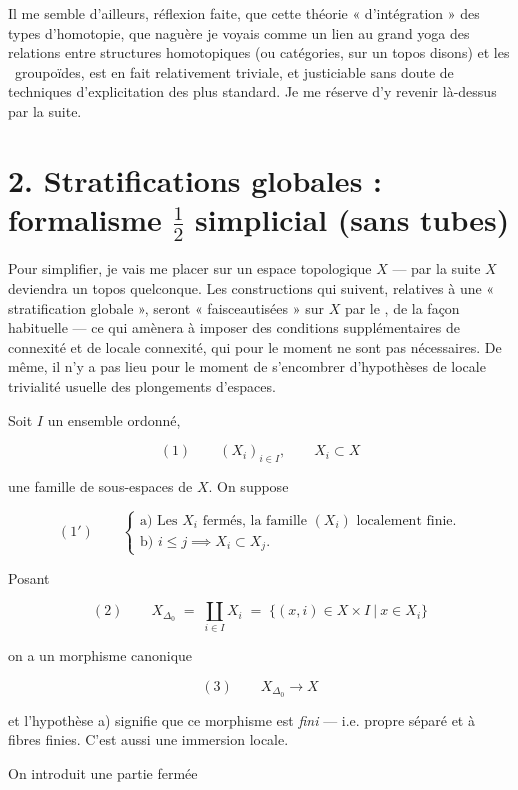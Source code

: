 \documentclass[11pt,a4paper]{article}
\begin{document}
Il me semble d'ailleurs, réflexion faite, que cette théorie « d'intégration »
des types d'homotopie, que naguère je voyais comme un lien au grand yoga des
relations entre structures homotopiques (ou catégories, sur un topos disons)
et les \ill\ groupoïdes, est en fait relativement triviale, et justiciable
sans doute de techniques d'explicitation des plus standard. Je me réserve d'y
revenir là-dessus par la suite.

\section*{2. Stratifications globales : formalisme $\tfrac{1}{2}$ simplicial (sans tubes)}

Pour simplifier, je vais me placer sur un espace topologique $X$ — par la
suite $X$ deviendra un topos quelconque. Les constructions qui suivent,
relatives à une « stratification globale », seront « faisceautisées » sur $X$
par le , de la façon habituelle — ce qui amènera 
à imposer des conditions supplémentaires de connexité et de locale connexité,
qui pour le moment ne sont pas nécessaires. De même, il n'y a pas lieu pour le
moment de s'encombrer d'hypothèses de locale trivialité usuelle des
plongements d'espaces.

Soit $I$ un ensemble ordonné, \struck{\ill}

\[
  (1) \qquad (X_i)_{i \in I}, \qquad X_i \subset X
\]

une famille de  sous-espaces de $X$. On suppose

\[
  (1') \qquad
  \begin{cases}
    \text{a) Les } X_i \text{ fermés, la famille } (X_i) \text{ localement finie.} \\
    \text{b) } i \leq j \implies X_i \subset X_j .
  \end{cases}
\]

Posant

\[
  (2) \qquad
  X_{\Delta_0} \;=\; \coprod_{i \in I} X_i
  \;=\; \bigl\{ (x,i) \in X \times I \ \big|\ x \in X_i \bigr\}
\]

on a un morphisme canonique

\[
  (3) \qquad X_{\Delta_0} \longrightarrow X
\]

et l'hypothèse a) signifie que ce morphisme \struck{\ill} est \emph{fini} —
i.e. propre séparé et à fibres finies. C'est aussi une immersion locale.

On introduit une partie fermée
\end{document}
